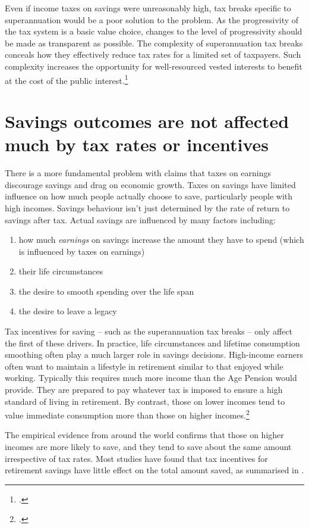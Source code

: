 \label{paragraph:SUPER-progressivity-should-be-transparent}
Even if income taxes on savings were unreasonably high, tax breaks specific to superannuation would be a poor solution to the problem. As the progressivity of the tax system is a basic value choice, changes to the level of progressivity should be made as transparent as possible. The complexity of superannuation tax breaks conceals how they effectively reduce tax rates for a limited set of taxpayers. Such complexity increases the opportunity for well-resourced vested interests to benefit at the cost of the public interest.\footcite{Teles2013}  

\section{Savings outcomes are not affected much by tax rates or incentives}\label{sec:SUPER-2-6}
There is a more fundamental problem with claims that taxes on earnings discourage savings and drag on economic growth. Taxes on savings have limited influence on how much people actually choose to save, particularly people with high incomes. Savings behaviour isn’t just determined by the rate of return to savings after tax. Actual savings are influenced by many factors including:
\begin{enumerate}
\item how much \emph{earnings} on savings increase the amount they have to spend (which is influenced by taxes on earnings)
\item their life circumstances
\item the desire to smooth spending over the life span
\item the desire to leave a legacy
\end{enumerate}

Tax incentives for saving -- such as the superannuation tax breaks -- only affect the first of these drivers. In practice, life circumstances and lifetime consumption smoothing often play a much larger role in savings decisions. High-income earners often want to maintain a lifestyle in retirement similar to that enjoyed while working. Typically this requires much more income than the Age Pension would provide. They are prepared to pay whatever tax is imposed to ensure a high standard of living in retirement. By contrast, those on lower incomes tend to value immediate consumption more than those on higher incomes.\footcite{DynanSkinnerZeldes2004}  

The empirical evidence from around the world confirms that those on higher incomes are more likely to save, and they tend to save about the same amount irrespective of tax rates. Most studies have found that tax incentives for retirement savings have little effect on the total amount saved, as summarised in .

